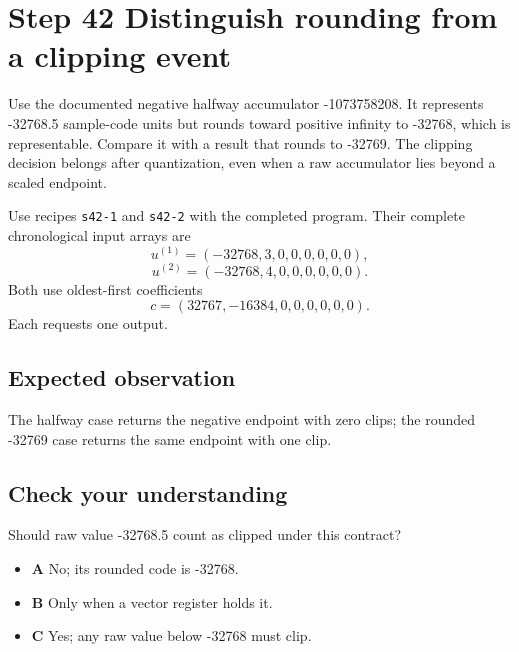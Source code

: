 \section{Step 42 Distinguish rounding from a clipping event}\label{fir-s42}

Use the documented negative halfway accumulator -1073758208. It represents -32768.5 sample-code units but rounds toward positive infinity to -32768, which is representable. Compare it with a result that rounds to -32769. The clipping decision belongs after quantization, even when a raw accumulator lies beyond a scaled endpoint.

Use recipes \texttt{s42-1} and \texttt{s42-2} with the completed program.
Their complete chronological input arrays are
\[
  u^{(1)}=(-32768,3,0,0,0,0,0,0),
\]
\[
  u^{(2)}=(-32768,4,0,0,0,0,0,0).
\]
Both use oldest-first coefficients
\[
  c=(32767,-16384,0,0,0,0,0,0).
\]
Each requests one output.

\subsection{Expected observation}
The halfway case returns the negative endpoint with zero clips; the rounded -32769 case returns the same endpoint with one clip.

\subsection{Check your understanding}
Should raw value -32768.5 count as clipped under this contract?

\begin{itemize}
  \item \textbf{A} No; its rounded code is -32768.
  \item \textbf{B} Only when a vector register holds it.
  \item \textbf{C} Yes; any raw value below -32768 must clip.
\end{itemize}
